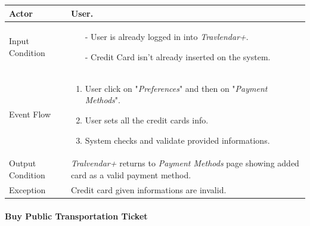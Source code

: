 		\begin{tabular}{| l | p{} | }
			\hline
			\hline
			Actor	&		User. \\
			\hline
			Input Condition		&		\begin{itemize}
													\item[-] User is already logged in into \textit{Travlendar+}.
													\item[-] Credit Card isn't already inserted on the system.
												\end{itemize} \\
			\hline
			Event Flow		&		\begin{enumerate}
												\item User click on "\textit{Preferences}" and then on "\textit{Payment Methods}".
												\item User sets all the credit cards info.
												\item System checks and validate provided informations.
											\end{enumerate} \\
			\hline
			Output Condition		&		\textit{Tralvendar+} returns to \textit{Payment Methods} page showing added card as a valid payment method. \\
			\hline		
			Exception		&		Credit card given informations are invalid. \\
			\hline
			\hline
		\end{tabular}


	\paragraph{Buy Public Transportation Ticket}
	
